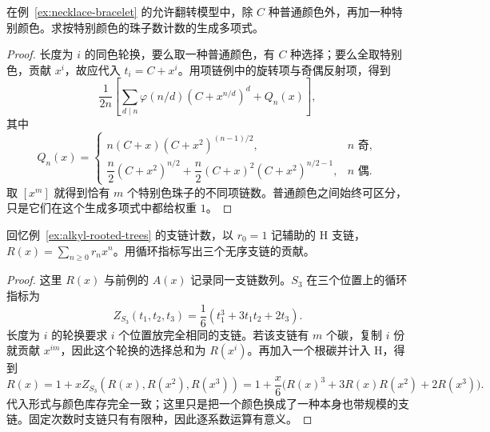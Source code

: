 \documentclass[lang=cn,a4paper,fontset=none,zihao=false,10pt,openany,twoside]{beautybook}
\numberwithin{algorithm}{chapter}
\begin{document}
\begin{example}[指定一种珠子的个数]
在例~\ref{ex:necklace-bracelet} 的允许翻转模型中，除 $C$ 种普通颜色外，再加一种特别颜色。求按特别颜色的珠子数计数的生成多项式。
\end{example}
\begin{proof}
长度为 $i$ 的同色轮换，要么取一种普通颜色，有 $C$ 种选择；要么全取特别色，贡献 $x^i$，故应代入 $t_i=C+x^i$。用项链例中的旋转项与奇偶反射项，得到
\[
 \frac1{2n}\left[\sum_{d\mid n}\varphi(n/d)(C+x^{n/d})^d+Q_n(x)\right],
\]
其中
\[
 Q_n(x)=\begin{cases}
 n(C+x)(C+x^2)^{(n-1)/2},&n\text{ 奇},\\
 \dfrac n2(C+x^2)^{n/2}+\dfrac n2(C+x)^2(C+x^2)^{n/2-1},&n\text{ 偶}.
 \end{cases}
\]
取 $[x^m]$ 就得到恰有 $m$ 个特别色珠子的不同项链数。普通颜色之间始终可区分，只是它们在这个生成多项式中都给权重 $1$。
\end{proof}

\begin{example}[重新解释无序碳支链的代入]
回忆例~\ref{ex:alkyl-rooted-trees} 的支链计数，以 $r_0=1$ 记辅助的 H 支链，$R(x)=\sum_{n\ge0}r_nx^n$。用循环指标写出三个无序支链的贡献。
\end{example}
\begin{proof}
这里 $R(x)$ 与前例的 $A(x)$ 记录同一支链数列。$S_3$ 在三个位置上的循环指标为
\[
 Z_{S_3}(t_1,t_2,t_3)=\frac16(t_1^3+3t_1t_2+2t_3).
\]
长度为 $i$ 的轮换要求 $i$ 个位置放完全相同的支链。若该支链有 $m$ 个碳，复制 $i$ 份就贡献 $x^{im}$，因此这个轮换的选择总和为 $R(x^i)$。再加入一个根碳并计入 H，得到
\[
 R(x)=1+xZ_{S_3}(R(x),R(x^2),R(x^3))
 =1+\frac x6\bigl(R(x)^3+3R(x)R(x^2)+2R(x^3)\bigr).
\]
代入形式与颜色库存完全一致；这里只是把一个颜色换成了一种本身也带规模的支链。固定次数时支链只有有限种，因此逐系数运算有意义。
\end{proof}
\end{document}
